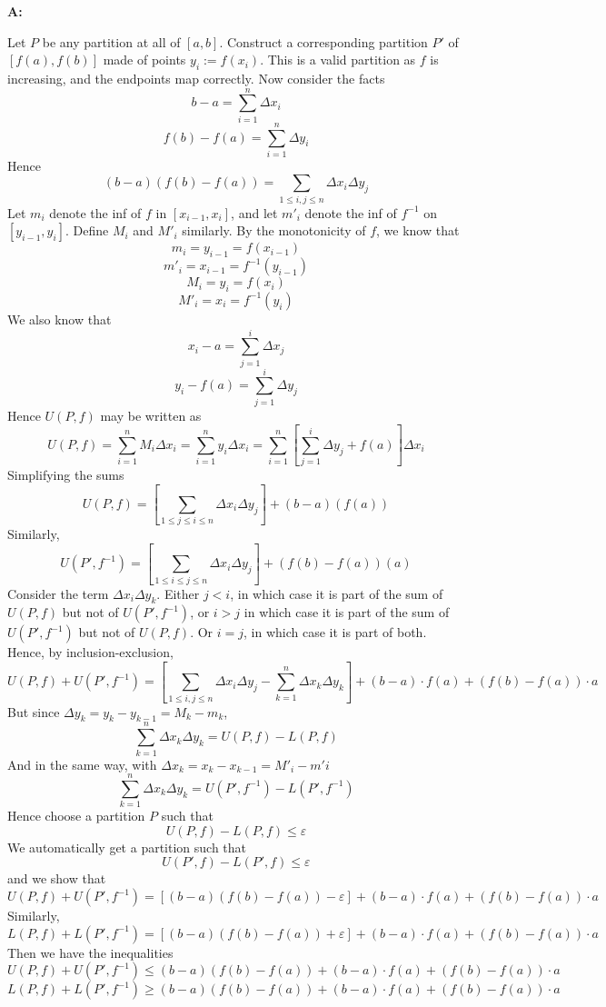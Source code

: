 \documentclass{article}
\newenvironment{Answer} {\par\noindent\textbf{A:}} {}
\begin{document}
\begin{Answer}
\begin{itemize}
        Let $P$ be any partition at all of $[a, b]$. Construct a corresponding partition $P'$ of $[f(a), f(b)]$ made of points $y_i := f(x_i)$. This is a valid partition as $f$ is increasing, and the endpoints map correctly. 
        Now consider the facts 
        \[b-a = \sum_{i=1}^n \Delta x_i\]
        \[f(b)-f(a) = \sum_{i=1}^n \Delta y_i\]
        Hence 
        \[(b-a)(f(b)-f(a)) = \sum_{1 \leq i , j \leq n} \Delta x_i \Delta y_j\]
        Let $m_i$ denote the inf of $f$ in $[x_{i-1}, x_i]$, and let $m'_i$ denote the inf of $f^{-1}$ on $[y_{i-1}, y_i]$. Define $M_i$ and $M'_i$ similarly.
        By the monotonicity of $f$, we know that 
        \[m_i = y_{i-1} = f(x_{i-1})\]
        \[m'_i = x_{i-1} = f^{-1}(y_{i-1})\]
        \[M_i = y_i = f(x_i)\]
        \[M'_i = x_i = f^{-1}(y_i)\]
        We also know that
        \[x_i - a = \sum_{j=1}^i \Delta x_j\]
        \[y_i - f(a) = \sum_{j=1}^i \Delta y_j\]
        Hence $U(P, f)$ may be written as
        \[U(P, f) = \sum_{i=1}^n M_i \Delta x_i = \sum_{i=1}^n y_i \Delta x_i = \sum_{i=1}^n \left[\sum_{j=1}^i \Delta y_j + f(a)\right] \Delta x_i\]
        Simplifying the sums
        \[U(P, f) = \left[\sum_{1 \leq j \leq i \leq n} \Delta x_i \Delta y_j \right] + (b-a)(f(a))\]
        Similarly,
        \[U(P', f^{-1}) = \left[\sum_{1 \leq i \leq j \leq n} \Delta x_i \Delta y_j \right] + (f(b)-f(a))(a)\]
        Consider the term $\Delta x_i \Delta y_k$. Either $j < i$, in which case it is part of the sum of $U(P, f)$ but not of $U(P', f^{-1})$, or $i > j$ in which case it is part of the sum of $U(P',f^{-1})$ but not of $U(P, f)$. Or $i = j$, in which case it is part of both.
        Hence, by inclusion-exclusion,
    \[U(P, f) + U(P', f^{-1}) = \left[ \sum_{1 \leq i , j \leq n} \Delta x_i \Delta y_j - \sum_{k=1}^n \Delta x_k \Delta y_k \right] + (b-a)\cdot f(a) + (f(b)-f(a))\cdot a\]
        But since $\Delta y_k = y_k - y_{k-1} = M_k - m_k$, 
        \[\sum_{k=1}^n \Delta x_k \Delta y_k = U(P, f) - L(P,f)\]
        And in the same way, with $\Delta x_k = x_k - x_{k-1} = M'_i - m'i$
        \[\sum_{k=1}^n \Delta x_k \Delta y_k = U(P', f^{-1}) - L(P',f^{-1})\]
        Hence choose a partition $P$ such that 
        \[U(P, f) - L(P,f) \leq \varepsilon\]
        We automatically get a partition such that
        \[U(P', f) - L(P',f) \leq \varepsilon\]
        and we show that
    \[U(P, f) + U(P', f^{-1}) = \left[ (b-a)(f(b)-f(a)) - \varepsilon \right] + (b-a)\cdot f(a) + (f(b)-f(a))\cdot a\]
        Similarly,
        \[L(P, f) + L(P', f^{-1}) = \left[ (b-a)(f(b)-f(a)) + \varepsilon \right] + (b-a)\cdot f(a) + (f(b)-f(a))\cdot a\]
        Then we have the inequalities
    \[U(P, f) + U(P', f^{-1}) \leq (b-a)(f(b)-f(a)) + (b-a)\cdot f(a) + (f(b)-f(a))\cdot a\]
        \[L(P, f) + L(P', f^{-1}) \geq (b-a)(f(b)-f(a)) + (b-a)\cdot f(a) + (f(b)-f(a))\cdot a\]


\end{itemize}
\end{Answer}
\end{document}
